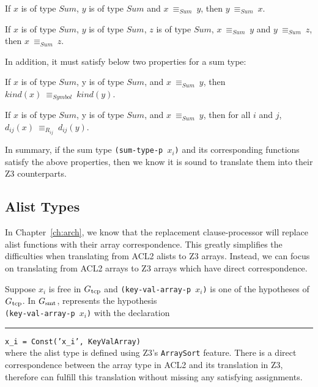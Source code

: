 \begin{property}
  If $x$ is of type $Sum$, $y$ is of type $Sum$ and $x\: \equiv_{Sum}\: y$, then
  $y\: \equiv_{Sum}\: x$. 
\end{property}

\begin{property}
  If $x$ is of type $Sum$, $y$ is of type $Sum$, $z$ is of type $Sum$,
  $x\: \equiv_{Sum}\: y$ and $y\: \equiv_{Sum}\: z$, then $x\: \equiv_{Sum}\: z$.
\end{property}

\noindent In addition, it must satisfy below two properties for a sum type:

\begin{property}
  If $x$ is of type $Sum$, y is of type $Sum$, and $x\: \equiv_{Sum}\: y$, then
  $kind(x)\: \equiv_{Symbol}\: kind(y)$.
\end{property}

\begin{property}
  If $x$ is of type $Sum$, y is of type $Sum$, and $x\: \equiv_{Sum}\: y$,
  then for all $i$ and $j$, $d_{ij}(x)\: \equiv_{R_{ij}}\: d_{ij}(y)$.
\end{property}

In summary, if the sum type \texttt{(sum-type-p $x_i$)} and its corresponding
functions satisfy the above properties, then we know it is sound to translate
them into their Z3 counterparts.

\subsection{Alist Types}\label{subsec:soundalisttype}
In Chapter~\ref{ch:arch}, we know that the replacement clause-processor will
replace alist functions with their array correspondence. This greatly simplifies
the difficulties when translating from ACL2 alists to Z3 arrays. Instead, we can
focus on translating from ACL2 arrays to Z3 arrays which have direct
correspondence.

Suppose  $x_i$ is free in $G_{\mathrm{tcp}}$ and \texttt{(key-val-array-p $x_i$)} is one of
the hypotheses of $G_{\mathrm{tcp}}$. In $G_{\mathrm{smt}}$, \smtlink{} represents the hypothesis \\
\texttt{(key-val-array-p $x_i$)} with the declaration\\
\rule{2em}{0ex}\texttt{x\_i = Const('x\_i', KeyValArray)}\\
where the alist type is defined using Z3's \texttt{ArraySort} feature. There is
a direct correspondence between the array type in ACL2 and its translation in
Z3, therefore \smtlink{} can fulfill this translation without missing any
satisfying assignments.

